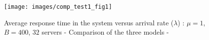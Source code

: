 \documentclass[conference]{IEEEtran}
\begin{document}
\begin{figure}[!h]
  \centering
  \texttt{[image: images/comp\_test1\_fig1]}
  \caption{Average response time in the system versus arrival rate ($\lambda$) : $\mu=1$, $B=400$, $32$ servers - Comparison of the three models -}
  \label{fig:image-chap4-comp_test1_fig1}
\end{figure}
% 
% 
% 
\end{document}
